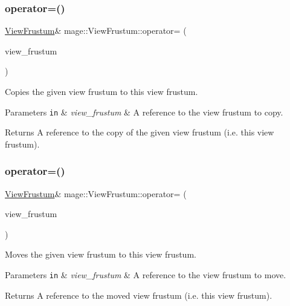 \subsubsection{\texorpdfstring{operator=()}{operator=()}\hspace{0.1cm}{\footnotesize\ttfamily [1/2]}}
{\footnotesize\ttfamily \hyperlink{structmage_1_1_view_frustum}{View\+Frustum}\& mage\+::\+View\+Frustum\+::operator= (\begin{DoxyParamCaption}\item[{const \hyperlink{structmage_1_1_view_frustum}{View\+Frustum} \&}]{view\+\_\+frustum }\end{DoxyParamCaption})\hspace{0.3cm}{\ttfamily [default]}}

Copies the given view frustum to this view frustum.


\begin{DoxyParams}[1]{Parameters}
\mbox{\tt in}  & {\em view\+\_\+frustum} & A reference to the view frustum to copy. \\
\hline
\end{DoxyParams}
\begin{DoxyReturn}{Returns}
A reference to the copy of the given view frustum (i.\+e. this view frustum). 
\end{DoxyReturn}
\hypertarget{structmage_1_1_view_frustum_a0167f34c3ba505155ed6064c6d98a99c}{}\label{structmage_1_1_view_frustum_a0167f34c3ba505155ed6064c6d98a99c} 
\subsubsection{\texorpdfstring{operator=()}{operator=()}\hspace{0.1cm}{\footnotesize\ttfamily [2/2]}}
{\footnotesize\ttfamily \hyperlink{structmage_1_1_view_frustum}{View\+Frustum}\& mage\+::\+View\+Frustum\+::operator= (\begin{DoxyParamCaption}\item[{\hyperlink{structmage_1_1_view_frustum}{View\+Frustum} \&\&}]{view\+\_\+frustum }\end{DoxyParamCaption})\hspace{0.3cm}{\ttfamily [default]}}

Moves the given view frustum to this view frustum.


\begin{DoxyParams}[1]{Parameters}
\mbox{\tt in}  & {\em view\+\_\+frustum} & A reference to the view frustum to move. \\
\hline
\end{DoxyParams}
\begin{DoxyReturn}{Returns}
A reference to the moved view frustum (i.\+e. this view frustum). 
\end{DoxyReturn}
\hypertarget{structmage_1_1_view_frustum_a35c0afb66692cfd26a0e9bee2065892e}{}\label{structmage_1_1_view_frustum_a35c0afb66692cfd26a0e9bee2065892e} 
